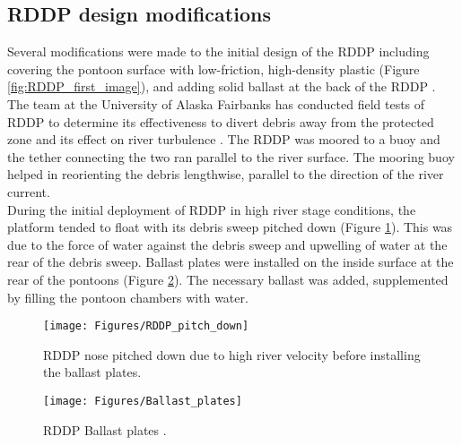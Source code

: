 \subsection{RDDP design modifications}
Several modifications were made to the initial design of the RDDP including covering the pontoon surface with low-friction, high-density plastic (Figure \ref{fig:RDDP_first_image}), and adding solid ballast at the back of the RDDP \cite{Reference7}.\\
The team at the University of Alaska Fairbanks has conducted field tests of RDDP to determine its effectiveness to divert debris away from the protected zone and its effect on river turbulence \cite{Reference7}. The RDDP was moored to a buoy and the tether connecting the two ran parallel to the river surface. The mooring buoy helped in reorienting the debris lengthwise, parallel to the direction of the river current.\\
During the initial deployment of RDDP in high river stage conditions, the platform tended to float with its debris sweep pitched down (Figure \ref{fig:RDDP_pitch_down}). This was due to the force of water against the debris sweep and upwelling of water at the rear of the debris sweep. Ballast plates were installed on the inside surface at the rear of the pontoons (Figure \ref{fig:Ballast_plates}). The necessary ballast was added, supplemented by filling the pontoon chambers with water.\\

\begin{figure}
\centering
\texttt{[image: Figures/RDDP\_pitch\_down]}
\caption{\label{fig:RDDP_pitch_down}RDDP nose pitched down due to high river velocity before installing the ballast plates\cite{Reference6}.}
\end{figure}
\begin{figure}
\centering
\texttt{[image: Figures/Ballast\_plates]}
\caption{\label{fig:Ballast_plates}RDDP Ballast plates \cite{Reference6}.}
\end{figure}


